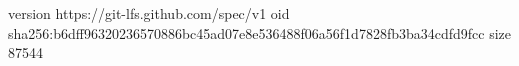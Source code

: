 version https://git-lfs.github.com/spec/v1
oid sha256:b6dff96320236570886bc45ad07e8e536488f06a56f1d7828fb3ba34cdfd9fcc
size 87544
